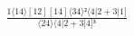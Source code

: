 \documentclass[varwidth, border=5pt]{standalone}
\begin{document}
\begin{my}
$\begin{gathered}
\scriptscriptstyle\frac{1⟨14⟩[12][14]⟨34⟩²⟨4|2+3|1]}{⟨24⟩⟨4|2+3|4]³}
\end{gathered}$
\end{my}
\end{document}
